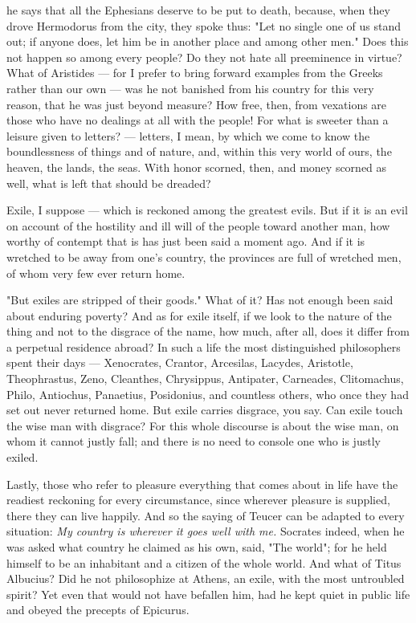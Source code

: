  he says that all the Ephesians deserve to be put to death, because, when they drove Hermodorus from the city, they spoke thus: "Let no single one of us stand out; if anyone does, let him be in another place and among other men." Does this not happen so among every people? Do they not hate all preeminence in virtue? What of Aristides — for I prefer to bring forward examples from the Greeks rather than our own — was he not banished from his country for this very reason, that he was just beyond measure? How free, then, from vexations are those who have no dealings at all with the people! For what is sweeter than a leisure given to letters? — letters, I mean, by which we come to know the boundlessness of things and of nature, and, within this very world of ours, the heaven, the lands, the seas. With honor scorned, then, and money scorned as well, what is left that should be dreaded?

 Exile, I suppose — which is reckoned among the greatest evils. But if it is an evil on account of the hostility and ill will of the people toward another man, how worthy of contempt that is has just been said a moment ago. And if it is wretched to be away from one's country, the provinces are full of wretched men, of whom very few ever return home.

 "But exiles are stripped of their goods." What of it? Has not enough been said about enduring poverty? And as for exile itself, if we look to the nature of the thing and not to the disgrace of the name, how much, after all, does it differ from a perpetual residence abroad? In such a life the most distinguished philosophers spent their days — Xenocrates, Crantor, Arcesilas, Lacydes, Aristotle, Theophrastus, Zeno, Cleanthes, Chrysippus, Antipater, Carneades, Clitomachus, Philo, Antiochus, Panaetius, Posidonius, and countless others, who once they had set out never returned home. But exile carries disgrace, you say. Can exile touch the wise man with disgrace? For this whole discourse is about the wise man, on whom it cannot justly fall; and there is no need to console one who is justly exiled.

 Lastly, those who refer to pleasure everything that comes about in life have the readiest reckoning for every circumstance, since wherever pleasure is supplied, there they can live happily. And so the saying of Teucer can be adapted to every situation: \textit{My country is wherever it goes well with me.} Socrates indeed, when he was asked what country he claimed as his own, said, "The world"; for he held himself to be an inhabitant and a citizen of the whole world. And what of Titus Albucius? Did he not philosophize at Athens, an exile, with the most untroubled spirit? Yet even that would not have befallen him, had he kept quiet in public life and obeyed the precepts of Epicurus.

